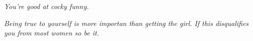 \documentclass[12pt]{article}
\begin{document}
\textit{You're good at cocky funny.}

\textit{Being true to yourself is more importan than getting the girl.  If this disqualifies you from most women so be it.}

\begin{comment}

It's on the girl to respond to the guy.  If she flirts back then that's on her and break it off.  If she tells him off and he doesn't get it, THEN you intervene.  

Look at things as they are, not as your emotions paint them.  The only remedy is to be aware that the pull of emotion is inevitable , to notice it when it is happening , and to compensate for it . When you have success , be extra wary . When you are angry , take no action . When you are fearful , know you are going to exaggerate the dangers you face . 

Remember: Every action and point of view can be attacked.  There's no such thing as a no critic frame.  


3. 
You should just stay in the Now.  It's way more fun.  Or you'll have more fun.  
For the Now page in the leviathon you should argue that the less you stay in the now the less you'll achieve clutch 


4. Don't be confident to achieve a particular tactical goal or struggle.  Be confident for the \textbf{fun} of it.  The struggle will resolve itself.


 5. Do not be fooled by other people's aura.  Ask what and why they are really doing it.  Then handle it however you want.

		* The most aggressive guys are also the most sensitive and afraid.  




It is a disease to be obsessed by the thought of winning. It is also a disease to be obsessed by the thought of employing your swordsmanship. So it is to be obsessed by the thought of using everything you have learned, and to be obsessed by the thought of attacking. It is also a disease to be obsessed and stuck with the thought of ridding yourself of any of these diseases. A disease here is an obsessed mind that dwells on one thing. Because all these diseases are in your mind, you must get rid of them to put your mind in order.

Greene, Robert. The 33 Strategies of War (Joost Elffers Books) . Penguin Publishing Group. Kindle Edition. 





\end{comment}
\end{document}
